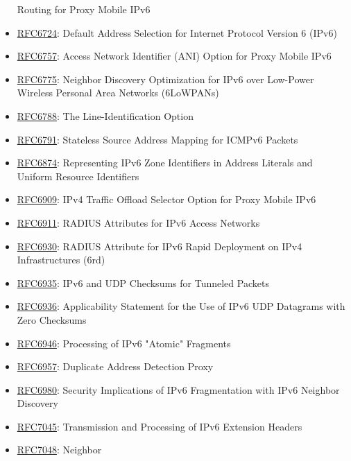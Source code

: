 \documentclass[
]{article}
\begin{document}
\begin{itemize}
  Routing for Proxy Mobile IPv6
\item
  \href{https://www.rfc-editor.org/info/rfc6724}{RFC6724}: Default
  Address Selection for Internet Protocol Version 6 (IPv6)
\item
  \href{https://www.rfc-editor.org/info/rfc6757}{RFC6757}: Access
  Network Identifier (ANI) Option for Proxy Mobile IPv6
\item
  \href{https://www.rfc-editor.org/info/rfc6775}{RFC6775}: Neighbor
  Discovery Optimization for IPv6 over Low-Power Wireless Personal Area
  Networks (6LoWPANs)
\item
  \href{https://www.rfc-editor.org/info/rfc6788}{RFC6788}: The
  Line-Identification Option
\item
  \href{https://www.rfc-editor.org/info/rfc6791}{RFC6791}: Stateless
  Source Address Mapping for ICMPv6 Packets
\item
  \href{https://www.rfc-editor.org/info/rfc6874}{RFC6874}: Representing
  IPv6 Zone Identifiers in Address Literals and Uniform Resource
  Identifiers
\item
  \href{https://www.rfc-editor.org/info/rfc6909}{RFC6909}: IPv4 Traffic
  Offload Selector Option for Proxy Mobile IPv6
\item
  \href{https://www.rfc-editor.org/info/rfc6911}{RFC6911}: RADIUS
  Attributes for IPv6 Access Networks
\item
  \href{https://www.rfc-editor.org/info/rfc6930}{RFC6930}: RADIUS
  Attribute for IPv6 Rapid Deployment on IPv4 Infrastructures (6rd)
\item
  \href{https://www.rfc-editor.org/info/rfc6935}{RFC6935}: IPv6 and UDP
  Checksums for Tunneled Packets
\item
  \href{https://www.rfc-editor.org/info/rfc6936}{RFC6936}: Applicability
  Statement for the Use of IPv6 UDP Datagrams with Zero Checksums
\item
  \href{https://www.rfc-editor.org/info/rfc6946}{RFC6946}: Processing of
  IPv6 "Atomic" Fragments
\item
  \href{https://www.rfc-editor.org/info/rfc6957}{RFC6957}: Duplicate
  Address Detection Proxy
\item
  \href{https://www.rfc-editor.org/info/rfc6980}{RFC6980}: Security
  Implications of IPv6 Fragmentation with IPv6 Neighbor Discovery
\item
  \href{https://www.rfc-editor.org/info/rfc7045}{RFC7045}: Transmission
  and Processing of IPv6 Extension Headers
\item
  \href{https://www.rfc-editor.org/info/rfc7048}{RFC7048}: Neighbor

\end{itemize}
\end{document}
